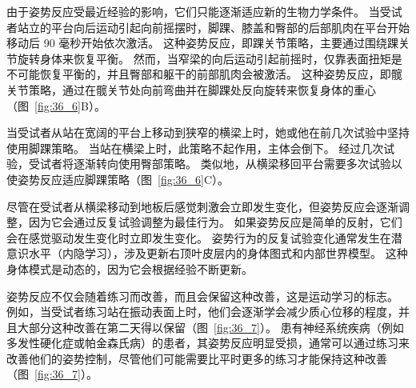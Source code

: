 由于姿势反应受最近经验的影响，它们只能逐渐适应新的生物力学条件。
当受试者站立的平台向后运动引起向前摇摆时，脚踝、膝盖和臀部的后部肌肉在平台开始移动后 90 毫秒开始依次激活。
这种姿势反应，即踝关节策略，主要通过围绕踝关节旋转身体来恢复平衡。
然而，当窄梁的向后运动引起前摇时，仅靠表面扭矩是不可能恢复平衡的，并且臀部和躯干的前部肌肉会被激活。
这种姿势反应，即髋关节策略，通过在髋关节处向前弯曲并在脚踝处反向旋转来恢复身体的重心（图~\ref{fig:36_6}B）。


当受试者从站在宽阔的平台上移动到狭窄的横梁上时，她或他在前几次试验中坚持使用脚踝策略。
当站在横梁上时，此策略不起作用，主体会倒下。
经过几次试验，受试者将逐渐转向使用臀部策略。
类似地，从横梁移回平台需要多次试验以使姿势反应适应脚踝策略（图~\ref{fig:36_6}C）。


尽管在受试者从横梁移动到地板后感觉刺激会立即发生变化，但姿势反应会逐渐调整，因为它会通过反复试验调整为最佳行为。
如果姿势反应是简单的反射，它们会在感觉驱动发生变化时立即发生变化。
姿势行为的反复试验变化通常发生在潜意识水平（内隐学习），涉及更新右顶叶皮层内的身体图式和内部世界模型。
这种身体模式是动态的，因为它会根据经验不断更新。


姿势反应不仅会随着练习而改善，而且会保留这种改善，这是运动学习的标志。
例如，当受试者练习站在振动表面上时，他们会逐渐学会减少质心位移的程度，并且大部分这种改善在第二天得以保留（图~\ref{fig:36_7}）。
患有神经系统疾病（例如多发性硬化症或帕金森氏病）的患者，其姿势反应明显受损，通常可以通过练习来改善他们的姿势控制，尽管他们可能需要比平时更多的练习才能保持这种改善（图~\ref{fig:36_7}）。


